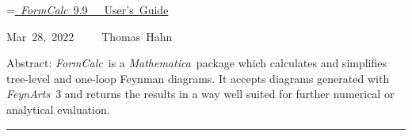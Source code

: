 \documentclass[twoside,11pt]{article}
\def\FA{\textit{FeynArts}}
\def\FC{\textit{FormCalc}}
\def\mma{\textit{Mathematica}}
\begin{document}
\thispagestyle{empty}

\vspace*{.7\textheight}

\newbox\titlebox\setbox\titlebox=\hbox{\underline{%
\vrule width 0pt height 0pt depth 2ex%
\Huge \FC~9.9~~~User's Guide}}

\hfill\copy\titlebox

\vspace*{1ex}

\hfill\hbox{Mar 28, 2022~~~~~Thomas Hahn}

\bigskip
\bigskip

\hfill\parbox{\wd\titlebox}{%
\begin{small}
Abstract:
\FC\ is a \mma\ package which calculates and simplifies tree-level and
one-loop Feynman diagrams.  It accepts diagrams generated with \FA\ 3
and returns the results in a way well suited for further numerical or
analytical evaluation.
\end{small}}

\clearpage

\vspace*{.5\textheight}
\vfill

\hrule

\medskip
\end{document}
